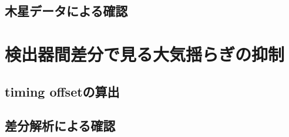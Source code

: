 \subsection{木星データによる確認}
\label{jupiter_ana}

\section{検出器間差分で見る大気揺らぎの抑制}

\subsection{timing offsetの算出}

\subsection{差分解析による確認}
